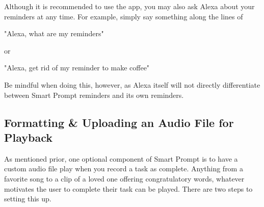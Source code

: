 \documentclass[11pt, oneside]{article}
\begin{document}
Although it is recommended to use the app, you may also ask Alexa about your reminders at any time.
For example, simply say something along the lines of
\begin{center}
"Alexa, what are my reminders"

or 

"Alexa, get rid of my reminder to make coffee"
\end{center}
Be mindful when doing this, however, as Alexa itself will not directly differentiate between Smart Prompt reminders and its own reminders.

\subsection{Formatting \& Uploading an Audio File for Playback}

As mentioned prior, one optional component of Smart Prompt is to have a custom audio file play when you record a task as complete. Anything from a favorite song to a clip of a loved one offering congratulatory words, whatever motivates the user to complete their task can be played. There are two steps to setting this up.
\end{document}
